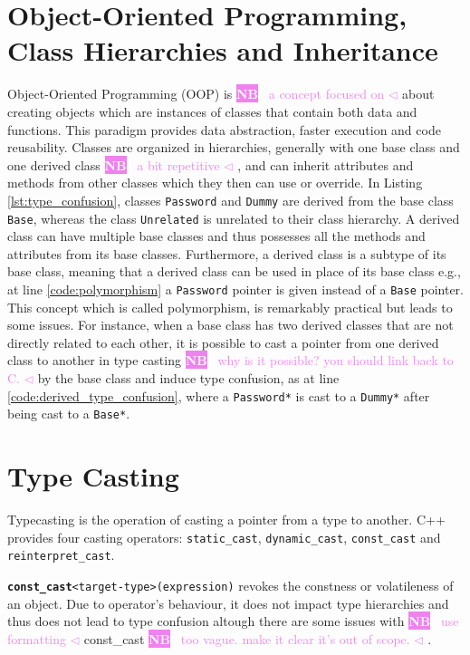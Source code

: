 \documentclass[a4paper,11pt,oneside]{report}
\newcommand{\todobox}[3]{%
       \colorbox{#1}{\textcolor{white}{\sffamily\bfseries\scriptsize #2}}%
       ~\textcolor{#1}{#3} %
       \textcolor{#1}{$\triangleleft$}%
}
\newcommand{\nb}[1]{\todobox{violet}{NB}{#1}}
\begin{document}
\section{Object-Oriented Programming, Class Hierarchies and Inheritance}
\label{sec:cpp_oop} Object-Oriented Programming (OOP) is \nb{a concept focused on} about creating objects
which are instances of classes that contain both data and functions. This
paradigm provides data abstraction, faster execution and code reusability.
Classes are organized in hierarchies, generally with one base class and one
derived class\nb{a bit repetitive}, and can inherit attributes and methods from other classes which
they then can use or override. In Listing \autoref{lst:type_confusion}, classes
\texttt{Password} and \texttt{Dummy} are derived from the base class
\texttt{Base}, whereas the class \texttt{Unrelated} is unrelated to their class
hierarchy.  A derived class can have multiple base classes and thus possesses
all the methods and attributes from its base classes.  Furthermore, a derived
class is a subtype of its base class, meaning that a derived class can be used
in place of its base class e.g., at line \ref{code:polymorphism} a
\texttt{Password} pointer is given instead of a \texttt{Base} pointer. This
concept which is called polymorphism, is remarkably practical but leads to some
issues. For instance, when a base class has two derived classes that are not
directly related to each other, it is possible to cast a pointer from one
derived class to another in type casting \nb{why is it possible? you should link back to C.} by the base class and induce type
confusion, as at line \ref{code:derived_type_confusion}, where a
\texttt{Password*} is cast to a \texttt{Dummy*} after being cast to a
\texttt{Base*}. 

\section{Type Casting} \label{sec:cpp_type_casting} Typecasting is the operation
of casting a pointer from a type to another. C++ provides four casting
operators: \texttt{static\_cast}, \texttt{dynamic\_cast}, \texttt{const\_cast}
and \texttt{reinterpret\_cast}. 

\texttt{\textbf{const\_cast}<target-type>(expression)} revokes the constness or
volatileness of an object. Due to operator's behaviour, it does not impact type
hierarchies and thus does not lead to type confusion altough there are some
issues with \nb{use formatting}const\_cast\nb{too vague. make it clear it's out of scope.}.
\end{document}
